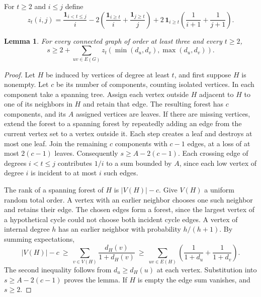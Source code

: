 \documentclass[11pt,a4paper]{article}
\newtheorem{lemma}[theorem]{Lemma}\newtheorem{corollary}[theorem]{Corollary}
\begin{document}
For $t\ge2$ and $i\le j$ define
\[
 z_t(i,j)=\frac{\mathbf1_{i<t\le j}}{i}
 -2\left(\frac{\mathbf1_{i\ge t}}i+\frac{\mathbf1_{j\ge t}}j\right)
 +2\,\mathbf1_{i\ge t}\left(\frac1{i+1}+\frac1{j+1}\right).
\]
\begin{lemma}\label{p07-lem:hub-components}
For every connected graph of order at least three and every $t\ge2$,
\[
 s\ge2+\sum_{uv\in E(G)} z_t(\min(d_u,d_v),\max(d_u,d_v)).
\]
\end{lemma}
\begin{proof}
Let $H$ be induced by vertices of degree at least $t$, and first suppose $H$ is nonempty. Let $c$ be its number of components, counting isolated vertices. In each component take a spanning tree. Assign each vertex outside $H$ adjacent to $H$ to one of its neighbors in $H$ and retain that edge. The resulting forest has $c$ components, and its $A$ assigned vertices are leaves. If there are missing vertices, extend the forest to a spanning forest by repeatedly adding an edge from the current vertex set to a vertex outside it. Each step creates a leaf and destroys at most one leaf. Join the remaining $c$ components with $c-1$ edges, at a loss of at most $2(c-1)$ leaves. Consequently $s\ge A-2(c-1)$. Each crossing edge of degrees $i<t\le j$ contributes $1/i$ to a sum bounded by $A$, since each low vertex of degree $i$ is incident to at most $i$ such edges.

The rank of a spanning forest of $H$ is $|V(H)|-c$. Give $V(H)$ a uniform random total order. A vertex with an earlier neighbor chooses one such neighbor and retains their edge. The chosen edges form a forest, since the largest vertex of a hypothetical cycle could not choose both incident cycle edges. A vertex of internal degree $h$ has an earlier neighbor with probability $h/(h+1)$. By summing expectations,
\[
 |V(H)|-c\ \ge\ \sum_{v\in V(H)}\frac{d_H(v)}{1+d_H(v)}
 \ \ge\ \sum_{uv\in E(H)}\left(\frac1{1+d_u}+\frac1{1+d_v}\right).
\]
The second inequality follows from $d_u\ge d_H(u)$ at each vertex. Substitution into $s\ge A-2(c-1)$ proves the lemma. If $H$ is empty the edge sum vanishes, and $s\ge2$.
\end{proof}
\end{document}
